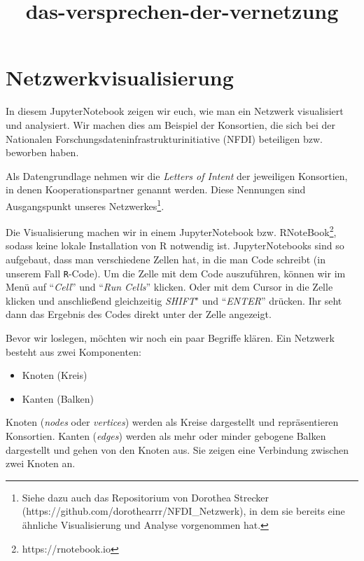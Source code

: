 \documentclass[11pt]{article}
\title{das-versprechen-der-vernetzung}
\providecommand{\tightlist}{%
      \setlength{\itemsep}{0pt}\setlength{\parskip}{0pt}}
\begin{document}
    
    \maketitle
    
    

    
    \hypertarget{netzwerkvisualisierung}{%
\section{Netzwerkvisualisierung}\label{netzwerkvisualisierung}}

In diesem JupyterNotebook zeigen wir euch, wie man ein Netzwerk
visualisiert und analysiert. Wir machen dies am Beispiel der Konsortien,
die sich bei der Nationalen Forschungsdateninfrastrukturinitiative
(NFDI) beteiligen bzw. beworben haben.

Als Datengrundlage nehmen wir die \emph{Letters of Intent} der
jeweiligen Konsortien, in denen Kooperationspartner genannt werden.
Diese Nennungen sind Ausgangspunkt unseres Netzwerkes\footnote{Siehe
  dazu auch das Repositorium von Dorothea Strecker
  (https://github.com/dorothearrr/NFDI\_Netzwerk), in dem sie bereits
  eine ähnliche Visualisierung und Analyse vorgenommen hat.}.

Die Visualisierung machen wir in einem JupyterNotebook bzw.
RNoteBook\footnote{https://rnotebook.io}, sodass keine lokale
Installation von R notwendig ist. JupyterNotebooks sind so aufgebaut,
dass man verschiedene Zellen hat, in die man Code schreibt (in unserem
Fall \texttt{R}-Code). Um die Zelle mit dem Code auszuführen, können wir
im Menü auf ``\emph{Cell}'' und ``\emph{Run Cells}'' klicken. Oder mit
dem Cursor in die Zelle klicken und anschließend gleichzeitig
\emph{SHIFT}" und ``\emph{ENTER}'' drücken. Ihr seht dann das Ergebnis
des Codes direkt unter der Zelle angezeigt.

    Bevor wir loslegen, möchten wir noch ein paar Begriffe klären. Ein
Netzwerk besteht aus zwei Komponenten:

\begin{itemize}
\tightlist
\item
  Knoten (Kreis)
\item
  Kanten (Balken)
\end{itemize}

Knoten (\emph{nodes} oder \emph{vertices}) werden als Kreise dargestellt
und repräsentieren Konsortien. Kanten (\emph{edges}) werden als mehr
oder minder gebogene Balken dargestellt und gehen von den Knoten aus.
Sie zeigen eine Verbindung zwischen zwei Knoten an.
\end{document}
